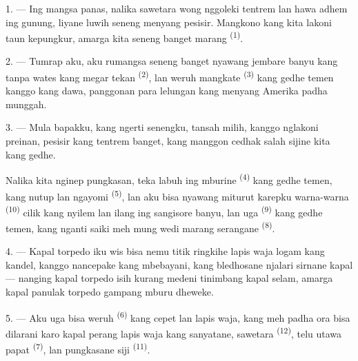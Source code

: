 \VUsaut{4.0mm}
\VUsaut{3.0mm}
\VUsaut{3.0mm}

1. --- Ing mangsa panas, nalika sawetara wong nggoleki tentrem lan hawa
adhem ing gunung, liyane luwih seneng menyang pesisir. Mangkono kang
kita lakoni taun kepungkur, amarga kita seneng banget marang
 \textsuperscript{(1)}.

2. --- Tumrap aku, aku rumangsa seneng banget nyawang jembare banyu
kang tanpa wates kang megar tekan 
\textsuperscript{(2)}, lan weruh mangkate 
\textsuperscript{(3)} kang gedhe temen kanggo  kang
dawa, panggonan para lelungan kang menyang Amerika padha munggah.

3. --- Mula bapakku, kang ngerti senengku, tansah milih, kanggo
nglakoni preinan, pesisir kang tentrem banget, kang manggon cedhak
salah sijine  kita kang gedhe.

Nalika kita nginep pungkasan,  teka labuh ing
mburine  \textsuperscript{(4)} kang gedhe temen,
kang nutup lan ngayomi  \textsuperscript{(5)},
lan aku bisa nyawang miturut karepku warna-warna   \textsuperscript{(10)} cilik kang nyilem
lan ilang ing sangisore banyu, lan uga  \textsuperscript{(9)} kang gedhe temen, kang nganti saiki meh mung
wedi marang serangane  \textsuperscript{(8)}.

\VUsaut{3.0mm}
\VUsaut{3.0mm}

4. --- Kapal torpedo iku wis bisa  nemu titik
ringkihe lapis waja logam kang kandel, kanggo nancepake
 kang mbebayani, kang bledhosane njalari sirnane kapal
— nanging kapal torpedo isih kurang medeni tinimbang kapal selam,
amarga kapal panulak torpedo gampang mburu dheweke.

5. --- Aku uga bisa weruh  \textsuperscript{(6)}
kang cepet lan lapis waja, kang meh padha ora bisa dilarani karo kapal
perang lapis waja kang sanyatane, sawetara 
\textsuperscript{(12)}, telu utawa papat 
\textsuperscript{(7)}, lan pungkasane siji 
\textsuperscript{(11)}. 

